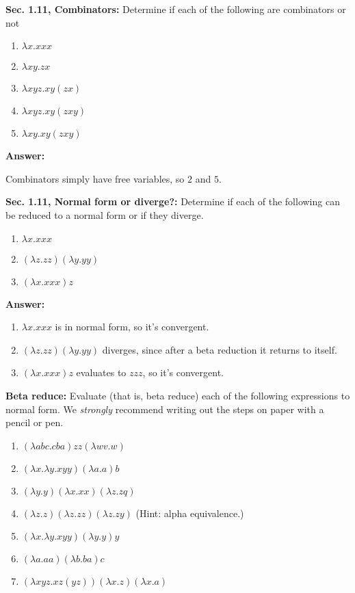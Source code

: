 \documentclass{article}
\begin{document}
\textbf{Sec. 1.11, Combinators: }Determine if each of the following are combinators or not

\begin{enumerate}
	\item $\lambda x.xxx$
	\item $\lambda xy.zx$
	\item $\lambda xyz.xy(zx)$
	\item $\lambda xyz.xy(zxy)$
	\item $\lambda xy.xy(zxy)$
\end{enumerate}

\textbf{Answer:}

Combinators simply have free variables, so $2$ and $5$.

\textbf{Sec. 1.11, Normal form or diverge?: }Determine if each of the following can be reduced to a normal form or if they diverge.

\begin{enumerate}
	\item $\lambda x.xxx$
	\item $(\lambda z.zz)(\lambda y.yy)$
	\item $(\lambda x.xxx)z$
\end{enumerate}

\textbf{Answer:}

\begin{enumerate}
	\item $\lambda x.xxx$ is in normal form, so it's convergent.
	\item $(\lambda z.zz)(\lambda y.yy)$ diverges, since after a beta reduction it returns to itself.
	\item $(\lambda x.xxx)z$ evaluates to $zzz$, so it's convergent.
\end{enumerate}

\textbf{Beta reduce: }Evaluate (that is, beta reduce) each of the following expressions to normal form. We \textit{strongly} recommend writing out the steps on paper with a pencil or pen.

\begin{enumerate}
	\item $(\lambda abc.cba)zz(\lambda wv.w)$
	\item $(\lambda x.\lambda y.xyy)(\lambda a.a)b$
	\item $(\lambda y.y)(\lambda x.xx)(\lambda z.zq)$
	\item $(\lambda z.z)(\lambda z.zz)(\lambda z.zy)$ (Hint: alpha equivalence.)
	\item $(\lambda x.\lambda y.xyy)(\lambda y.y)y$
	\item $(\lambda a.aa)(\lambda b.ba)c$
	\item $(\lambda xyz.xz(yz))(\lambda x.z)(\lambda x.a)$
\end{enumerate}
\end{document}
